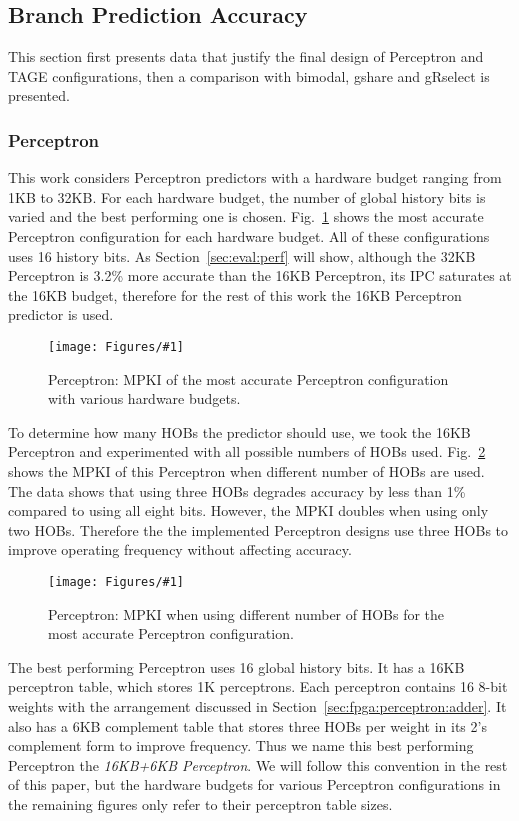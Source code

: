 \documentclass[conference]{IEEEtran}
\newcommand{\kfig}[4]{ %
        \begin{figure}[!t]
        \centering
        \texttt{[image: Figures/\#1]}
        \vspace{-1mm}
        \caption{#3}
        \vspace{-6mm}
        \label{#2}
        \end{figure}
}
\begin{document}
\subsection{Branch Prediction Accuracy}
\label{sec:eval:accuracy}
This section first presents data that justify the final design of Perceptron and TAGE configurations, then a comparison with bimodal, gshare and gRselect is presented.

\subsubsection{Perceptron}
\label{sec:eval:accuracy:perceptron}
This work considers Perceptron predictors with a hardware budget ranging from 1KB to 32KB. For each hardware budget, the number of global history bits is varied and the best performing one is chosen. Fig.~\ref{fig:perceptronMPKI} shows the most accurate Perceptron configuration for each hardware budget. All of these configurations uses 16 history bits. As Section~\ref{sec:eval:perf} will show, although the 32KB Perceptron is 3.2\% more accurate than the 16KB Perceptron, its IPC saturates at the 16KB budget, therefore for the rest of this work the 16KB Perceptron predictor is used.
\kfig{perceptronMPKI.pdf}{fig:perceptronMPKI}{Perceptron: MPKI of the most accurate Perceptron configuration with various hardware budgets.}{angle = 0, trim = 0.9in 2.7in 0.8in 2.7in, clip, width=0.35\textwidth}

To determine how many HOBs the predictor should use, we took the 16KB Perceptron and experimented with all possible numbers of HOBs used. Fig.~\ref{fig:perceptronHOB} shows the MPKI of this Perceptron when different number of HOBs are used. The data shows that using three HOBs degrades accuracy by less than 1\% compared to using all eight bits. However, the MPKI doubles when using only two HOBs. Therefore the the implemented Perceptron designs use three HOBs to improve operating frequency without affecting accuracy.
\kfig{perceptronHOB.pdf}{fig:perceptronHOB}{Perceptron: MPKI when using different number of HOBs for the most accurate Perceptron configuration.}{angle = 0, trim = 1in 2.6in 1in 2.6in, clip, width=0.35\textwidth}

The best performing Perceptron uses 16 global history bits. It has a 16KB perceptron table, which stores 1K perceptrons. Each perceptron contains 16 8-bit weights with the arrangement discussed in Section~\ref{sec:fpga:perceptron:adder}. It also has a 6KB complement table that stores three HOBs per weight in its 2's complement form to improve frequency. Thus we name this best performing Perceptron the \textit{16KB+6KB Perceptron}. We will follow this convention in the rest of this paper, but the hardware budgets for various Perceptron configurations in the remaining figures only refer to their perceptron table sizes.
\end{document}

